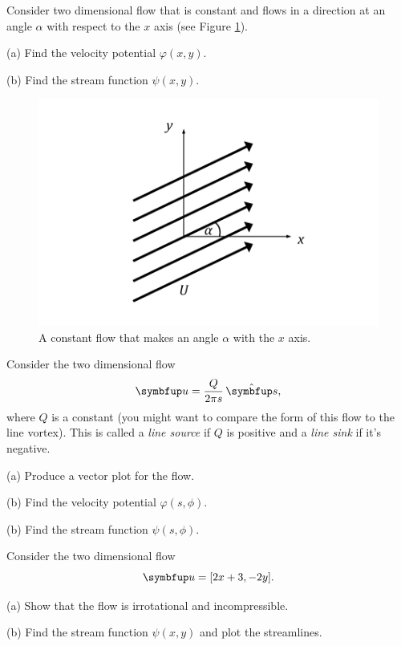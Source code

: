 \begin{problem}
\label{prob_uniform_pot}
Consider two dimensional flow that is constant and flows in a direction at an angle $\alpha$ with respect to the $x$ axis (see Figure \ref{fig_uniform_flow_angle}).  

(a) Find the velocity potential $\varphi(x, y)$.

(b) Find the stream function $\psi(x, y)$.

\begin{figure}[t]
\centering\includegraphics[width=0.7\linewidth]{Figures/Chapter3/fig_uniform_flow_angle}
\caption{A constant flow that makes an angle $\alpha$ with the $x$ axis.}
\label{fig_uniform_flow_angle}
\end{figure}
\end{problem}

\begin{problem}
\label{prob_line_source}
Consider the two dimensional flow 
\begin{equation}
\uu = \frac{Q}{2\pi s} \, \unit{s},
\end{equation}
where $Q$ is a constant (you might want to compare the form of this flow to the line vortex).  This is called a \emph{line source} if $Q$ is positive and a \emph{line sink} if it's negative.

(a) Produce a vector plot for the flow.

(b) Find the  velocity potential $\varphi(s, \phi)$.

(b) Find the stream function $\psi(s, \phi)$.
\end{problem}

\begin{problem}
Consider the two dimensional flow
\[
\uu = [2x+3, -2y].
\]

(a) Show that the flow is irrotational and incompressible.

(b) Find the stream function $\psi(x, y)$ and plot the streamlines.
\end{problem}
